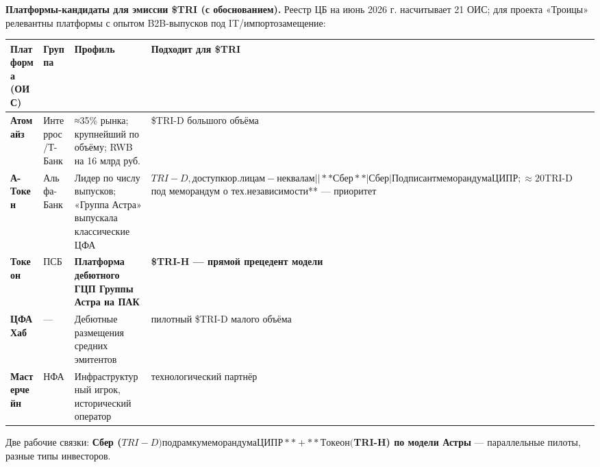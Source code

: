 \documentclass[
  russian,
]{article}
\begin{document}
\textbf{Платформы-кандидаты для эмиссии \$TRI (с обоснованием).} Реестр
ЦБ на июнь 2026 г. насчитывает 21 ОИС; для проекта «Троицы» релевантны
платформы с опытом B2B-выпусков под IT/импортозамещение:

\begin{longtable}[]{@{}
  >{\raggedright\arraybackslash}p{}
  >{\raggedright\arraybackslash}p{}
  >{\raggedright\arraybackslash}p{}
  >{\raggedright\arraybackslash}p{}@{}}
\toprule\noalign{}
\begin{minipage}[b]{\linewidth}\raggedright
Платформа (ОИС)
\end{minipage} & \begin{minipage}[b]{\linewidth}\raggedright
Группа
\end{minipage} & \begin{minipage}[b]{\linewidth}\raggedright
Профиль
\end{minipage} & \begin{minipage}[b]{\linewidth}\raggedright
Подходит для \$TRI
\end{minipage} \\
\midrule\noalign{}
\endhead
\bottomrule\noalign{}
\endlastfoot
\textbf{Атомайз} & Интеррос/Т-Банк & ≈35\% рынка; крупнейший по объёму;
RWB на 16 млрд руб. & \$TRI-D большого объёма \\
\textbf{А-Токен} & Альфа-Банк & Лидер по числу выпусков; «Группа Астра»
выпускала классические ЦФА & \(TRI-D, доступ к юр.лицам-неквалам |
| **Сбер** | Сбер | Подписант меморандума ЦИПР; ≈20%
\)TRI-D под меморандум о тех.независимости** --- приоритет \\
\textbf{Токеон} & ПСБ & \textbf{Платформа дебютного ГЦП Группы Астра на
ПАК} & \textbf{\$TRI-H --- прямой прецедент модели} \\
\textbf{ЦФА Хаб} & --- & Дебютные размещения средних эмитентов &
пилотный \$TRI-D малого объёма \\
\textbf{Мастерчейн} & НФА & Инфраструктурный игрок, исторический
оператор & технологический партнёр \\
\end{longtable}

Две рабочие связки: \textbf{Сбер
(\(TRI-D) под рамку меморандума ЦИПР** + **Токеон (\)TRI-H) по модели
Астры} --- параллельные пилоты, разные типы инвесторов.
\end{document}
